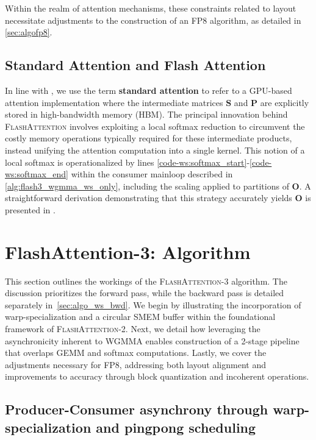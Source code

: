 Within the realm of attention mechanisms, these constraints related to layout necessitate adjustments to the construction of an FP8 algorithm, as detailed in \cref{sec:algofp8}.

\subsection{Standard Attention and Flash Attention} In line with \citet{dao2022flashattention}, we use the term \textbf{standard attention} to refer to a GPU-based attention implementation where the intermediate matrices $\mathbf{S}$ and $\mathbf{P}$ are explicitly stored in high-bandwidth memory (HBM). The principal innovation behind \textsc{FlashAttention} involves exploiting a local softmax reduction to circumvent the costly memory operations typically required for these intermediate products, instead unifying the attention computation into a single kernel. This notion of a local softmax is operationalized by lines \ref{code-ws:softmax_start}-\ref{code-ws:softmax_end} within the consumer mainloop described in \cref{alg:flash3_wgmma_ws_only}, including the scaling applied to partitions of $\mathbf{O}$. A straightforward derivation demonstrating that this strategy accurately yields $\mathbf{O}$ is presented in \cite[\S 2.3.1]{dao2023flashattention2}.

\section{FlashAttention-3: Algorithm}
\label{sec:algo}

This section outlines the workings of the \textsc{FlashAttention-3} algorithm. The discussion prioritizes the forward pass, while the backward pass is detailed separately in~\cref{sec:algo_ws_bwd}. We begin by illustrating the incorporation of warp-specialization and a circular SMEM buffer within the foundational framework of \textsc{FlashAttention-2}. Next, we detail how leveraging the asynchronicity inherent to WGMMA enables construction of a 2-stage pipeline that overlaps GEMM and softmax computations. Lastly, we cover the adjustments necessary for FP8, addressing both layout alignment and improvements to accuracy through block quantization and incoherent operations.

\subsection{Producer-Consumer asynchrony through warp-specialization and pingpong scheduling}
\label{sec:algo_ws}

